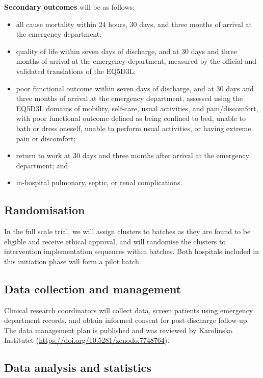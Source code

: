 \documentclass[
  11pt,
]{article}
\providecommand{\tightlist}{%
  \setlength{\itemsep}{0pt}\setlength{\parskip}{0pt}}
\begin{document}
\textbf{Secondary outcomes} will be as follows:

\begin{itemize}
\tightlist
\item
  all cause mortality within 24 hours, 30 days, and three months of arrival at the emergency department;
\item
  quality of life within seven days of discharge, and at 30 days and three months of arrival at the emergency department, measured by the official and validated translations of the EQ5D3L;
\item
  poor functional outcome within seven days of discharge, and at 30 days and three months of arrival at the emergency department, assessed using the EQ5D3L domains of mobility, self-care, usual activities, and pain/discomfort, with poor functional outcome defined as being confined to bed, unable to bath or dress oneself, unable to perform usual activities, or having extreme pain or discomfort;
\item
  return to work at 30 days and three months after arrival at the emergency department; and
\item
  in-hospital pulmonary, septic, or renal complications.
\end{itemize}

\hypertarget{randomisation}{%
\subsection{Randomisation}\label{randomisation}}

In the full scale trial, we will assign clusters to batches as they are found to be eligible and receive ethical approval, and will randomise the clusters to intervention implementation sequences within batches. Both hospitals included in this initiation phase will form a pilot batch.

\hypertarget{data-collection-and-management}{%
\subsection{Data collection and management}\label{data-collection-and-management}}

Clinical research coordinators will collect data, screen patients using emergency department records, and obtain informed consent for post-discharge follow-up. The data management plan is published and was reviewed by Karolinska Institutet (\url{https://doi.org/10.5281/zenodo.7748764}).

\hypertarget{data-analysis-and-statistics}{%
\subsection{Data analysis and statistics}\label{data-analysis-and-statistics}}
\end{document}

